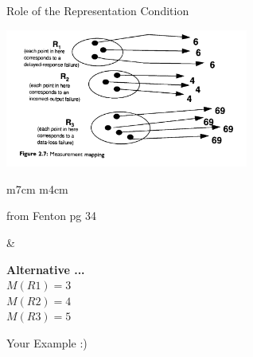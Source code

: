 \documentclass{beamer}
\begin{document}
\begin{frame}{\centerline{Role of the Representation Condition}}


\includegraphics[width=80mm]{A2022.IDSEPC.SperimentazioneDeduzione/img-img12.png}

\begin{table}[H]
\begin{tabulary}{\textwidth}{m{7cm} m{4cm}}
\begin{small}
\begin{center}
from Fenton pg 34
\end{center}
\end{small}&
\begin{tcolorbox}
\textbf{Alternative ...}\\
\(M(R1) = 3\)\\
\(M(R2) = 4\)\\
\(M(R3) = 5\)
\end{tcolorbox}

\end{tabulary}
\end{table}


\end{frame}

\begin{frame}{\centerline{}}

\begin{center}
{\Large
Your Example :)
}
\end{center}


\end{frame}
\end{document}
